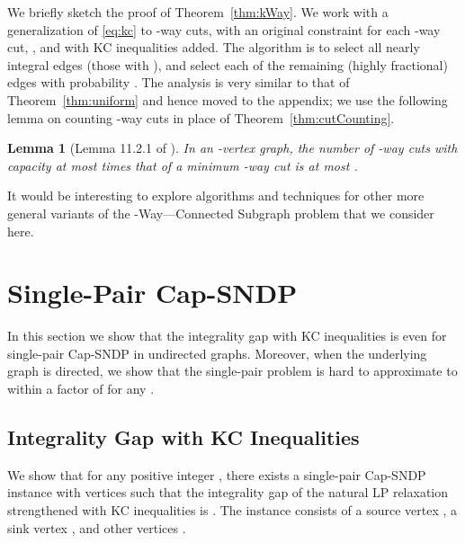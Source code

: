 \documentclass[11pt]{article}
\newcounter{thm0Rcopies}
\newcounter{thm_saved}
\newtheorem{lemma}{Lemma}[section]
\def\KCLP{\eqref{eq:kc}\xspace}
\def\kway{-Way---Connected Subgraph\xspace}
\begin{document}
We briefly sketch the proof of Theorem~\ref{thm:kWay}.
We work with a generalization of \KCLP to -way cuts, with an
original constraint for each -way cut, , and
with KC inequalities added. The algorithm is to select all nearly
integral edges  (those with ), and
select each of the remaining (highly fractional) edges  with
probability .  The analysis is very similar to
that of Theorem~\ref{thm:uniform} and hence moved to the
appendix; we use the following lemma on
counting -way cuts in place of Theorem~\ref{thm:cutCounting}. 



\begin{lemma}[Lemma 11.2.1 of \cite{Karger}]\label{lem:kWayCutCounting}
  In an -vertex graph, the number of -way cuts with capacity at
  most  times that of a minimum -way cut is at most . 
\end{lemma}

It would be interesting to explore algorithms and techniques for other
more general variants of the \kway problem that we consider here.

\section{Single-Pair Cap-SNDP}
\label{sec:single-pair}

In this section we show that the integrality gap with KC inequalities
is  even for single-pair Cap-SNDP in undirected
graphs. Moreover, when the underlying graph is directed, we show that
the single-pair problem is hard to approximate to within a factor of
 for any .

\subsection{Integrality Gap with KC Inequalities}
\label{sec:kcBad}

\iffalse
In this section, we describe a simple example to show that adding
KC-inequalities does not always significantly reduce the integrality
gap of the natural LP for Cap-SNDP. In particular, we examine the
special case of Cap--SNDP.
\fi

We show that for any positive integer , there exists a single-pair
Cap-SNDP instance  with  vertices such that the integrality
gap of the natural LP relaxation strengthened with KC inequalities is
. The instance  consists of a source vertex , a sink
vertex , and  other vertices .
\end{document}
